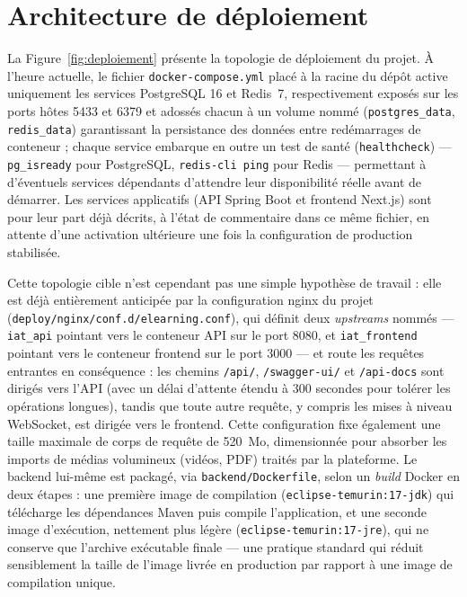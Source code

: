 \section{Architecture de déploiement}

La Figure~\ref{fig:deploiement} présente la topologie de déploiement du
projet. À l'heure actuelle, le fichier \texttt{docker-compose.yml} placé à
la racine du dépôt active uniquement les services PostgreSQL 16 et Redis~7,
respectivement exposés sur les ports hôtes 5433 et 6379 et adossés chacun
à un volume nommé (\texttt{postgres\_data}, \texttt{redis\_data}) garantissant
la persistance des données entre redémarrages de conteneur ; chaque service
embarque en outre un test de santé (\texttt{healthcheck}) --- \texttt{pg\_isready}
pour PostgreSQL, \texttt{redis-cli ping} pour Redis --- permettant à
d'éventuels services dépendants d'attendre leur disponibilité réelle avant
de démarrer. Les services applicatifs (API Spring Boot et frontend
Next.js) sont pour leur part déjà décrits, à l'état de commentaire dans ce
même fichier, en attente d'une activation ultérieure une fois la
configuration de production stabilisée.

Cette topologie cible n'est cependant pas une simple hypothèse de travail :
elle est déjà entièrement anticipée par la configuration nginx du projet
(\texttt{deploy/nginx/conf.d/elearning.conf}), qui définit deux
\emph{upstreams} nommés --- \texttt{iat\_api} pointant vers le conteneur API
sur le port 8080, et \texttt{iat\_frontend} pointant vers le conteneur
frontend sur le port 3000 --- et route les requêtes entrantes en
conséquence : les chemins \texttt{/api/}, \texttt{/swagger-ui/} et
\texttt{/api-docs} sont dirigés vers l'API (avec un délai d'attente étendu
à 300 secondes pour tolérer les opérations longues), tandis que toute autre
requête, y compris les mises à niveau WebSocket, est dirigée vers le
frontend. Cette configuration fixe également une taille maximale de corps
de requête de 520~Mo, dimensionnée pour absorber les imports de médias
volumineux (vidéos, PDF) traités par la plateforme. Le backend lui-même
est packagé, via \texttt{backend/Dockerfile}, selon un \emph{build} Docker
en deux étapes : une première image de compilation (\texttt{eclipse-temurin:17-jdk})
qui télécharge les dépendances Maven puis compile l'application, et une
seconde image d'exécution, nettement plus légère
(\texttt{eclipse-temurin:17-jre}), qui ne conserve que l'archive
exécutable finale --- une pratique standard qui réduit sensiblement la
taille de l'image livrée en production par rapport à une image de
compilation unique.

